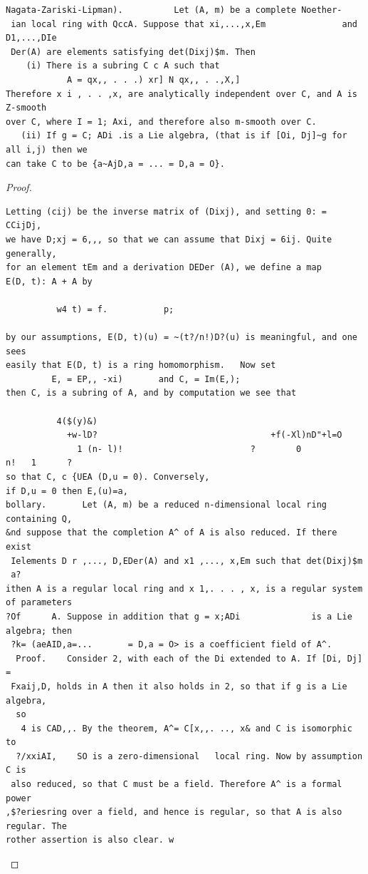 \begin{theorem}\label{mcrt-auto-theorem-30-1}\uses{}
\begin{verbatim}
Nagata-Zariski-Lipman).          Let (A, m) be a complete Noether-
 ian local ring with QccA. Suppose that xi,...,x,Em               and D1,...,DIe
 Der(A) are elements satisfying det(Dixj)$m. Then
    (i) There is a subring C c A such that
            A = qx,, . . .) xr] N qx,, . .,X,]
Therefore x i , . . ,x, are analytically independent over C, and A is Z-smooth
over C, where I = 1; Axi, and therefore also m-smooth over C.
   (ii) If g = C; ADi .is a Lie algebra, (that is if [Oi, Dj]~g for all i,j) then we
can take C to be {a~AjD,a = ... = D,a = O}.
\end{verbatim}
\end{theorem}
\begin{proof}
\begin{verbatim}
Letting (cij) be the inverse matrix of (Dixj), and setting 0: = CCijDj,
we have D;xj = 6,,, so that we can assume that Dixj = 6ij. Quite generally,
for an element tEm and a derivation DEDer (A), we define a map
E(D, t): A + A by

          w4 t) = f.           p;

by our assumptions, E(D, t)(u) = ~(t?/n!)D?(u) is meaningful, and one sees
easily that E(D, t) is a ring homomorphism.   Now set
         E, = EP,, -xi)       and C, = Im(E,);
then C, is a subring of A, and by computation we see that

          4($(y)&)
            +w-lD?                                  +f(-Xl)nD"+l=O
              1 (n- l)!                         ?        0           n!   1      ?
so that C, c {UEA (D,u = 0). Conversely,                                  if D,u = 0 then E,(u)=a,
bollary.       Let (A, m) be a reduced n-dimensional local ring containing Q,
&nd suppose that the completion A^ of A is also reduced. If there exist
 Ielements D r ,..., D,EDer(A) and x1 ,..., x,Em such that det(Dixj)$m
 a?
ithen A is a regular local ring and x 1,. . . , x, is a regular system of parameters
?Of      A. Suppose in addition that g = x;ADi              is a Lie algebra; then
 ?k= (aeAID,a=...       = D,a = O> is a coefficient field of A^.
  Proof.    Consider 2, with each of the Di extended to A. If [Di, Dj] =
 Fxaij,D, holds in A then it also holds in 2, so that if g is a Lie algebra,
  so
   4 is CAD,,. By the theorem, A^= C[x,,. .., x& and C is isomorphic to
  ?/xxiAI,    SO is a zero-dimensional   local ring. Now by assumption C is
 also reduced, so that C must be a field. Therefore A^ is a formal power
,$?eriesring over a field, and hence is regular, so that A is also regular. The
rother assertion is also clear. w
\end{verbatim}
\end{proof}


